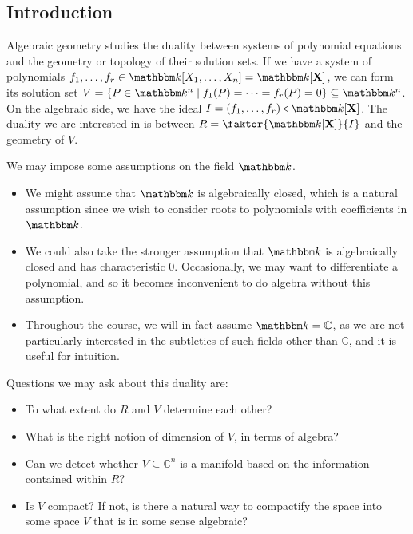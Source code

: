 \subsection{Introduction}
Algebraic geometry studies the duality between systems of polynomial equations and the geometry or topology of their solution sets.
If we have a system of polynomials \( f_1, \dots, f_r \in \mathbbm k[X_1, \dots, X_n] = \mathbbm k[\vb X] \), we can form its solution set \( V = \qty{P \in \mathbbm k^n \mid f_1(P) = \dots = f_r(P) = 0} \subseteq \mathbbm k^n\).
On the algebraic side, we have the ideal \( I = (f_1, \dots, f_r) \triangleleft \mathbbm k[\vb X] \).
The duality we are interested in is between \( R = \faktor{\mathbbm k[\vb X]}{I} \) and the geometry of \( V \).

We may impose some assumptions on the field \( \mathbbm k \).
\begin{itemize}
    \item We might assume that \( \mathbbm k \) is algebraically closed, which is a natural assumption since we wish to consider roots to polynomials with coefficients in \( \mathbbm k \).
    \item We could also take the stronger assumption that \( \mathbbm k \) is algebraically closed and has characteristic 0.
    Occasionally, we may want to differentiate a polynomial, and so it becomes inconvenient to do algebra without this assumption.
    \item Throughout the course, we will in fact assume \( \mathbbm k = \mathbb C \), as we are not particularly interested in the subtleties of such fields other than \( \mathbb C \), and it is useful for intuition.
\end{itemize}
Questions we may ask about this duality are:
\begin{itemize}
    \item To what extent do \( R \) and \( V \) determine each other?
    \item What is the right notion of dimension of \( V \), in terms of algebra?
    \item Can we detect whether \( V \subseteq \mathbb C^n \) is a manifold based on the information contained within \( R \)?
    \item Is \( V \) compact?
    If not, is there a natural way to compactify the space into some space \( \overline V \) that is in some sense algebraic?
\end{itemize}

